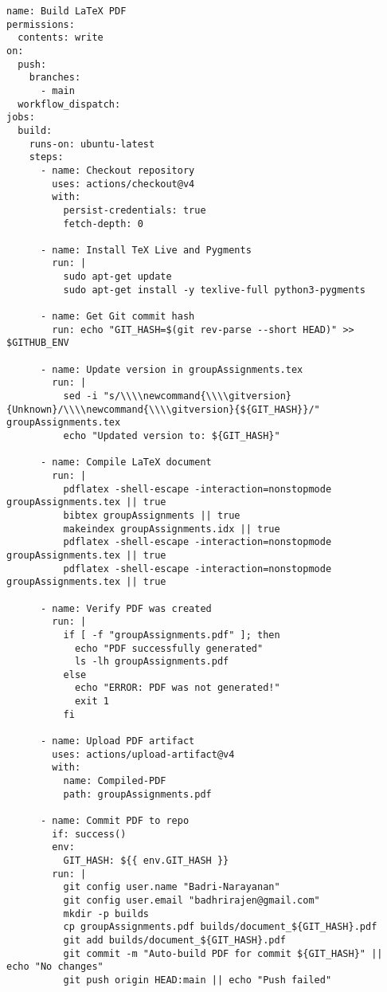 \begin{verbatim}
name: Build LaTeX PDF
permissions:
  contents: write
on:
  push:
    branches:
      - main
  workflow_dispatch:
jobs:
  build:
    runs-on: ubuntu-latest
    steps:
      - name: Checkout repository
        uses: actions/checkout@v4
        with:
          persist-credentials: true
          fetch-depth: 0
      
      - name: Install TeX Live and Pygments
        run: |
          sudo apt-get update
          sudo apt-get install -y texlive-full python3-pygments
      
      - name: Get Git commit hash
        run: echo "GIT_HASH=$(git rev-parse --short HEAD)" >> $GITHUB_ENV
      
      - name: Update version in groupAssignments.tex
        run: |
          sed -i "s/\\\\newcommand{\\\\gitversion}{Unknown}/\\\\newcommand{\\\\gitversion}{${GIT_HASH}}/" groupAssignments.tex
          echo "Updated version to: ${GIT_HASH}"
      
      - name: Compile LaTeX document
        run: |
          pdflatex -shell-escape -interaction=nonstopmode groupAssignments.tex || true
          bibtex groupAssignments || true
          makeindex groupAssignments.idx || true
          pdflatex -shell-escape -interaction=nonstopmode groupAssignments.tex || true
          pdflatex -shell-escape -interaction=nonstopmode groupAssignments.tex || true
      
      - name: Verify PDF was created
        run: |
          if [ -f "groupAssignments.pdf" ]; then
            echo "PDF successfully generated"
            ls -lh groupAssignments.pdf
          else
            echo "ERROR: PDF was not generated!"
            exit 1
          fi
      
      - name: Upload PDF artifact
        uses: actions/upload-artifact@v4
        with:
          name: Compiled-PDF
          path: groupAssignments.pdf
      
      - name: Commit PDF to repo
        if: success()
        env:
          GIT_HASH: ${{ env.GIT_HASH }}
        run: |
          git config user.name "Badri-Narayanan"
          git config user.email "badhrirajen@gmail.com"
          mkdir -p builds
          cp groupAssignments.pdf builds/document_${GIT_HASH}.pdf
          git add builds/document_${GIT_HASH}.pdf
          git commit -m "Auto-build PDF for commit ${GIT_HASH}" || echo "No changes"
          git push origin HEAD:main || echo "Push failed"
\end{verbatim}

